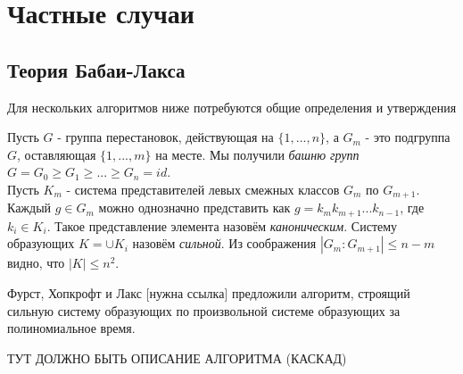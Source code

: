 \section{Частные случаи}



\subsection{Теория Бабаи-Лакса}
Для нескольких алгоритмов ниже потребуются общие определения и утверждения

Пусть $G$ - группа перестановок, действующая на $\{1, ..., n\}$, а $G_m$ - это подгруппа $G$, оставляющая $\{1, ..., m\}$ на месте. Мы получили \textit{башню групп} 
$G = G_0 \geqslant G_1 \geqslant ... \geqslant G_n = id$.\\
Пусть $K_m$ - система представителей левых смежных классов $G_m$ по $G_{m+1}$. Каждый $g \in G_m$ можно однозначно представить как $g = k_m k_{m + 1} ... k_{n - 1}$, где $k_i \in K_i$. Такое представление элемента назовём \textit{каноническим}. Систему образующих $K = \cup K_i$ назовём \textit{сильной}. Из соображения $|G_m : G_{m + 1}| \leqslant n - m$ видно, что $|K| \leqslant n^2$. 

Фурст, Хопкрофт и Лакс [нужна ссылка] предложили алгоритм, строящий сильную систему образующих по произвольной системе образующих за полиномиальное время.

ТУТ ДОЛЖНО БЫТЬ ОПИСАНИЕ АЛГОРИТМА (КАСКАД)



